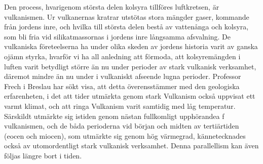 \documentclass[a4paper, 12pt, oneside, swedish]{article}
\begin{document}
Den process, hvarigenom största delen kolsyra tillföres luftkretsen, är vulkanismen. Ur vulkanernas kratrar utstötas stora mängder gaser, kommande från jordens inre, och hvilka till största delen bestå av vattenånga och kolsyra, som bli fria vid silikatmassornas i jordens inre långsamma afsvalning. De vulkaniska företeelserna ha under olika skeden av jordens historia varit av ganska ojämn styrka, hvarför vi ha all anledning att förmoda, att kolsyremängden i luften varit betydligt större än nu under perioder av stark vulkanisk verksamhet, däremot mindre än nu under i vulkaniskt afseende lugna perioder. Professor Frech i Breslau har sökt visa, att detta överensstämmer med den geologiska erfarenheten, i det att tider utmärkta genom stark Vulkanism också uppvisat ett varmt klimat, och att ringa Vulkanism varit samtidig med låg temperatur. Särskildt utmärkte sig istiden genom nästan fullkomligt upphörandea f vulkanismen, och de båda perioderna vid början och midten av tertiärtiden (eocen och miocen), som utmärkte sig genom hög värmegrad, kännetecknades också av utomordentligt stark vulkanisk verksamhet. Denna parallellism kan även följas längre bort i tiden.
\end{document}
